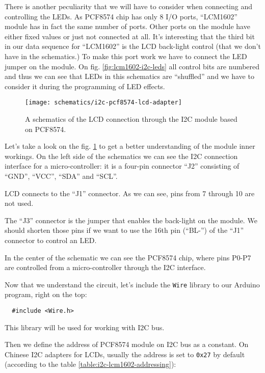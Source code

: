\documentclass[../sparc.tex]{subfiles}
\begin{document}
There is another peculiarity that we will have to consider when connecting and
controlling the LEDs.  As PCF8574 chip has only 8 I/O ports, ``LCM1602'' module
has in fact the same number of ports.  Other ports on the module have either
fixed values or just not connected at all.  It's interesting that the third bit
in our data sequence for ``LCM1602'' is the LCD back-light control (that we
don't have in the schematics.)  To make this port work we have to connect the
LED jumper on the module.  On fig. \ref{fig:lcm1602-i2c-leds} all control bits
are numbered and thus we can see that LEDs in this schematics are ``shuffled''
and we have to consider it during the programming of LED effects.

\begin{figure}[H]
  \centering
  \texttt{[image: schematics/i2c-pcf8574-lcd-adapter]}
  \caption{A schematics of the LCD connection through the I2C module based on
    PCF8574.}
  \label{fig:i2c-pcf8574-lcd-adapter-schematics}
\end{figure}

Let's take a look on the fig. \ref{fig:i2c-pcf8574-lcd-adapter-schematics} to
get a better understanding of the module inner workings.  On the left side of
the schematics we can see the I2C connection interface for a micro-controller:
it is a four-pin connector ``J2'' consisting of ``GND'', ``VCC'', ``SDA'' and
``SCL''.

LCD connects to the ``J1'' connector.  As we can see, pins from 7 through 10 are
not used.

The ``J3'' connector is the jumper that enables the back-light on the module.
We should shorten those pins if we want to use the 16th pin (``BL-'') of the
``J1'' connector to control an LED.

In the center of the schematic we can see the PCF8574 chip, where pins P0-P7 are
controlled from a micro-controller through the I2C interface.

Now that we understand the circuit, let's include the \texttt{Wire} library to
our Arduino program, right on the top:

\begin{verbatim}
  #include <Wire.h>
\end{verbatim}

This library will be used for working with I2C bus.

Then we define the address of PCF8574 module on I2C bus as a constant.  On
Chinese I2C adapters for LCDs, usually the address is set to \texttt{0x27} by
default (according to the table \ref{table:i2c-lcm1602-addressing}):
\end{document}
